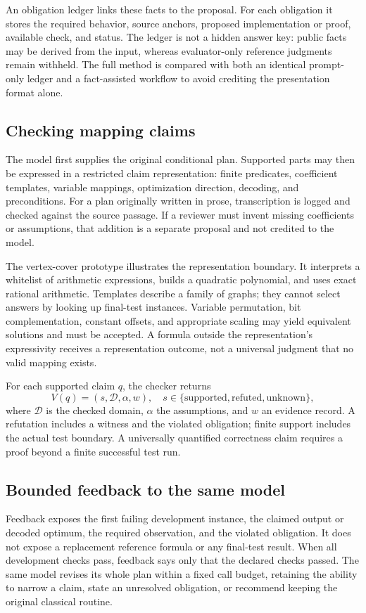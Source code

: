 An obligation ledger links these facts to the proposal. For each obligation it
stores the required behavior, source anchors, proposed implementation or proof,
available check, and status. The ledger is not a hidden answer key: public facts
may be derived from the input, whereas evaluator-only reference judgments remain
withheld. The full method is compared with both an identical prompt-only ledger
and a fact-assisted workflow to avoid crediting the presentation format alone.

\subsection{Checking mapping claims}
The model first supplies the original conditional plan. Supported parts may then
be expressed in a restricted claim representation: finite predicates, coefficient
templates, variable mappings, optimization direction, decoding, and preconditions.
For a plan originally written in prose, transcription is logged and checked against
the source passage. If a reviewer must invent missing coefficients or assumptions,
that addition is a separate proposal and not credited to the model.

The vertex-cover prototype illustrates the representation boundary. It interprets
a whitelist of arithmetic expressions, builds a quadratic polynomial, and uses
exact rational arithmetic. Templates describe a family of graphs; they cannot
select answers by looking up final-test instances. Variable permutation, bit
complementation, constant offsets, and appropriate scaling may yield equivalent
solutions and must be accepted. A formula outside the representation's expressivity
receives a representation outcome, not a universal judgment that no valid mapping
exists.

For each supported claim $q$, the checker returns
\begin{equation}
 V(q)=(s,\mathcal{D},\alpha,w),\quad
 s\in\{\text{supported},\text{refuted},\text{unknown}\},
 \label{eq:verdict}
\end{equation}
where $\mathcal{D}$ is the checked domain, $\alpha$ the assumptions, and $w$ an
evidence record. A refutation includes a witness and the violated obligation;
finite support includes the actual test boundary. A universally quantified
correctness claim requires a proof beyond a finite successful test run.

\subsection{Bounded feedback to the same model}
Feedback exposes the first failing development instance, the claimed output or
decoded optimum, the required observation, and the violated obligation. It does
not expose a replacement reference formula or any final-test result. When all
development checks pass, feedback says only that the declared checks passed.
The same model revises its whole plan within a fixed call budget, retaining the
ability to narrow a claim, state an unresolved obligation, or recommend keeping
the original classical routine.

